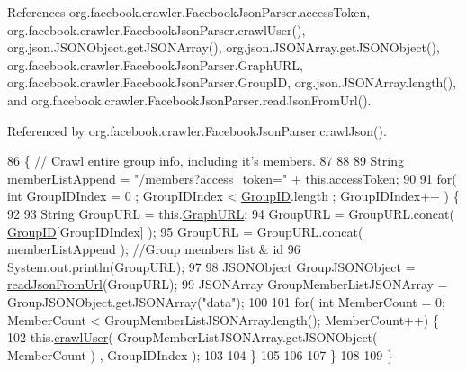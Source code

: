 References org.\-facebook.\-crawler.\-Facebook\-Json\-Parser.\-access\-Token, org.\-facebook.\-crawler.\-Facebook\-Json\-Parser.\-crawl\-User(), org.\-json.\-J\-S\-O\-N\-Object.\-get\-J\-S\-O\-N\-Array(), org.\-json.\-J\-S\-O\-N\-Array.\-get\-J\-S\-O\-N\-Object(), org.\-facebook.\-crawler.\-Facebook\-Json\-Parser.\-Graph\-U\-R\-L, org.\-facebook.\-crawler.\-Facebook\-Json\-Parser.\-Group\-I\-D, org.\-json.\-J\-S\-O\-N\-Array.\-length(), and org.\-facebook.\-crawler.\-Facebook\-Json\-Parser.\-read\-Json\-From\-Url().



Referenced by org.\-facebook.\-crawler.\-Facebook\-Json\-Parser.\-crawl\-Json().


\begin{DoxyCode}
86                                                                               \{ \textcolor{comment}{// Crawl entire group info,
       including it's members.}
87         
88         
89         String memberListAppend = \textcolor{stringliteral}{"/members?access\_token="} + this.\hyperlink{classorg_1_1facebook_1_1crawler_1_1_facebook_json_parser_a31fa96aed58c0b5ab6a156224d88cc19}{accessToken};
90                 
91         \textcolor{keywordflow}{for}( \textcolor{keywordtype}{int} GroupIDIndex = 0 ; GroupIDIndex < \hyperlink{classorg_1_1facebook_1_1crawler_1_1_facebook_json_parser_a648157fbf1ba62f4197ce78c35a4a5da}{GroupID}.length ; GroupIDIndex++ ) \{
92             
93             String GroupURL = this.\hyperlink{classorg_1_1facebook_1_1crawler_1_1_facebook_json_parser_a432ef64a6d8e4575ff9e1f03a2fb1ab2}{GraphURL};
94             GroupURL = GroupURL.concat( \hyperlink{classorg_1_1facebook_1_1crawler_1_1_facebook_json_parser_a648157fbf1ba62f4197ce78c35a4a5da}{GroupID}[GroupIDIndex] );
95             GroupURL = GroupURL.concat( memberListAppend ); \textcolor{comment}{//Group members list & id}
96             System.out.println(GroupURL);  
97       
98             JSONObject GroupJSONObject = \hyperlink{classorg_1_1facebook_1_1crawler_1_1_facebook_json_parser_ad27f29e060383659be657f065bd069c2}{readJsonFromUrl}(GroupURL);
99             JSONArray GroupMemberListJSONArray = GroupJSONObject.getJSONArray(\textcolor{stringliteral}{"data"});
100             
101             \textcolor{keywordflow}{for}( \textcolor{keywordtype}{int} MemberCount = 0; MemberCount < GroupMemberListJSONArray.length(); MemberCount++) \{
102                 this.\hyperlink{classorg_1_1facebook_1_1crawler_1_1_facebook_json_parser_a94c4a859c2d3abd9b7ed95121ae74998}{crawlUser}( GroupMemberListJSONArray.getJSONObject( MemberCount ) , 
      GroupIDIndex );
103                 
104             \}
105             
106             
107         \}
108         
109     \}
\end{DoxyCode}
